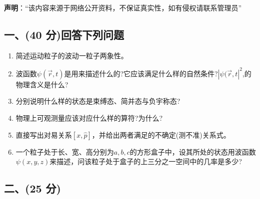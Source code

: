
\textbf{声明}：“该内容来源于网络公开资料，不保证真实性，如有侵权请联系管理员”

\subsection{一、(40 分)回答下列问题}
\begin{enumerate}
\item 简述运动粒子的波动一粒子两象性。
\item 波函数$\psi(\vec{r},t)$是用来描述什么的?它应该满足什么样的自然条件?$|\psi(\vec{r},t|^2$,的物理含义是什么?
\item 分别说明什么样的状态是束缚态、简并态与负宇称态?
\item 物理上可观测量应该对应什么样的算符?为什么?
\item 直接写出对易关系$[x,\hat{p}]$，并给出两者满足的不确定(测不准)关系式。
\item 一个粒子处于长、宽、高分别为$a,b,c$的方形盒子中，设其所处的状态用波函数$\psi(x,y,z)$来描述，问该粒子处于盒子的上三分之一空间中的几率是多少?
\end{enumerate}
\subsection{二、(25 分)}